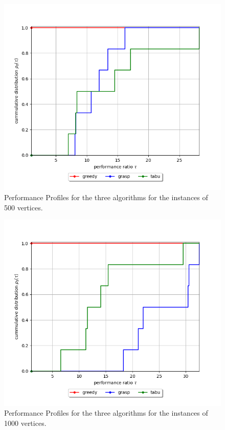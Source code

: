 \begin{figure}[H]
    \centering
    \includegraphics[width=\textwidth]{images/performance_profile/500_thmax_None.png}
    \caption{Performance Profiles for the three algorithms for the instances of 500 vertices.}
    \label{fig:perf-500}
\end{figure}


\begin{figure}[H]
    \centering
    \includegraphics[width=\textwidth]{images/performance_profile/1000_thmax_None.png}
    \caption{Performance Profiles for the three algorithms for the instances of 1000 vertices.}
    \label{fig:perf-1000}
\end{figure}
